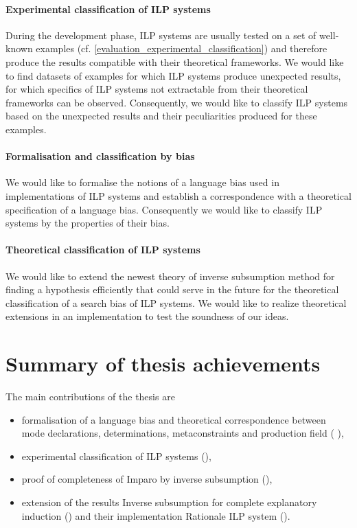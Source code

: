 \paragraph{Experimental classification of ILP systems}
During the development phase, ILP systems are usually tested on a set of well-known examples (cf. \ref{evaluation_experimental_classification}) and therefore produce the results compatible with their theoretical frameworks.
We would like to find datasets of examples for which ILP systems produce
unexpected results, for which specifics of ILP systems not extractable from their theoretical frameworks can be observed. Consequently, we would like to classify ILP systems based on the unexpected results and their peculiarities produced for these examples.
\paragraph{Formalisation and classification by bias}
We would like to formalise the notions of a language bias used in implementations of ILP systems and establish a correspondence with a theoretical specification of a language bias. Consequently we would like to classify ILP systems by the properties of their bias.
\paragraph{Theoretical classification of ILP systems}
We would like to extend the newest theory of inverse subsumption method for finding a hypothesis efficiently that could serve in the future for the theoretical classification of a search bias of ILP systems. We would like to realize theoretical extensions in an implementation to test the soundness of our ideas.

\section{Summary of thesis achievements}
The main contributions of the thesis are
\begin{itemize}
\item formalisation of a language bias and theoretical correspondence between mode declarations, determinations, metaconstraints and production field ( ),
\item experimental classification of ILP systems (),
\item proof of completeness of Imparo by inverse subsumption (),
\item extension of the results Inverse subsumption for complete explanatory induction () and their implementation Rationale ILP system ().
\end{itemize}

